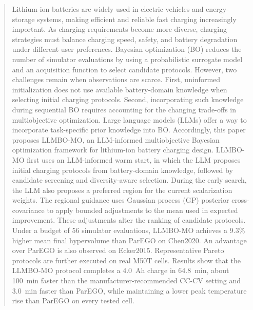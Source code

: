 \documentclass[journal]{IEEEtran}
\begin{document}
\maketitle
\begin{abstract}
Lithium-ion batteries are widely used in electric vehicles and energy-storage
systems, making efficient and reliable fast charging increasingly important.
As charging requirements become more diverse, charging strategies must balance
charging speed, safety, and battery degradation under different user
preferences. Bayesian optimization (BO) reduces the number of simulator
evaluations by using a probabilistic surrogate model and an acquisition
function to select candidate protocols. However, two challenges remain when
observations are scarce. First, uninformed initialization does not use available
battery-domain knowledge when selecting initial charging protocols. Second,
incorporating such knowledge during sequential BO requires accounting for the
changing trade-offs in multiobjective optimization. Large language models
(LLMs) offer a way to incorporate task-specific prior knowledge into BO.
Accordingly, this paper proposes LLMBO-MO, an LLM-informed multiobjective
Bayesian optimization framework for lithium-ion battery charging design.
LLMBO-MO first uses an LLM-informed warm start, in which the LLM proposes
initial charging protocols from battery-domain knowledge, followed by
candidate screening and diversity-aware selection. During the early search,
the LLM also proposes a preferred region for the current scalarization
weights. The regional guidance uses Gaussian process (GP) posterior
cross-covariance to apply bounded adjustments to the mean used in
expected improvement. These adjustments alter the ranking of candidate
protocols. Under a budget of 56 simulator evaluations, LLMBO-MO achieves a
9.3\% higher mean final hypervolume than ParEGO on Chen2020. An advantage over
ParEGO is also observed on Ecker2015. Representative Pareto protocols are
further executed on real M50T cells. Results show that the LLMBO-MO
protocol completes a 4.0~Ah charge in 64.8~min, about 100~min faster than
the manufacturer-recommended CC-CV setting and 3.0~min faster than ParEGO,
while maintaining a lower peak temperature rise than ParEGO on every
tested cell.
\end{abstract}
\end{document}
